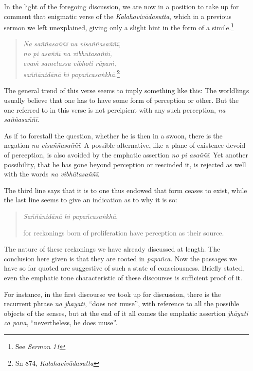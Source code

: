 In the light of the foregoing discussion, we are now in a position to take up for comment that enigmatic verse of the \emph{Kalahavivādasutta}, which in a previous sermon we left unexplained, giving only a slight hint in the form of a simile.\footnote{See \emph{Sermon 11}}

\begin{quote}
\emph{Na saññasaññī na visaññasaññī,}\\
\emph{no pi asaññī na vibhūtasaññī,}\\
\emph{evaṁ sametassa vibhoti rūpaṁ,}\\
\emph{saññānidānā hi papañcasaṅkhā.}\footnote{Sn 874, \emph{Kalahavivādasutta}}
\end{quote}

The general trend of this verse seems to imply something like this: The worldlings usually believe that one has to have some form of perception or other. But the one referred to in this verse is not percipient with any such perception, \emph{na saññasaññī}.

As if to forestall the question, whether he is then in a swoon, there is the negation \emph{na visaññasaññī}. A possible alternative, like a plane of existence devoid of perception, is also avoided by the emphatic assertion \emph{no pi asaññī}. Yet another possibility, that he has gone beyond perception or rescinded it, is rejected as well with the words \emph{na vibhūtasaññī}.

The third line says that it is to one thus endowed that form ceases to exist, while the last line seems to give an indication as to why it is so:

\begin{quote}
\emph{Saññānidānā hi papañcasaṅkhā},

for reckonings born of proliferation have perception as their source.
\end{quote}

The nature of these reckonings we have already discussed at length. The conclusion here given is that they are rooted in \emph{papañca}. Now the passages we have so far quoted are suggestive of such a state of consciousness. Briefly stated, even the emphatic tone characteristic of these discourses is sufficient proof of it.

For instance, in the first discourse we took up for discussion, there is the recurrent phrase \emph{na jhāyati}, ``does not muse'', with reference to all the possible objects of the senses, but at the end of it all comes the emphatic assertion \emph{jhāyati ca pana}, ``nevertheless, he does muse''.

